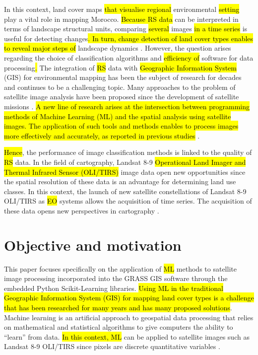 \documentclass[geomatics,article,submit,pdftex,moreauthors]{Definitions/mdpi}
\begin{document}
In this context, land cover maps \hl{that visualise regional} environmental \hl{setting} play a vital role in mapping\hl{ }Morocco. \hl{Because RS data} can be interpreted in terms of landscape structural units, comparing \hl{several }images \hl{in a time series }is useful for detecting changes\hl{. In turn, change detection of land cover types enables to reveal major steps of }landscape dynamics \cite{CAI2023103226,Lemenkova202405,XIONG2022109132}. However, the question arises regarding the choice of classification algorithms and \hl{efficiency of }software for data processing\hl{. }The integration of \hl{RS} data with \hl{Geographic Information System }(GIS) for environmental mapping has been the subject of research for decades and continues to be a challenging topic. Many approaches to the problem of satellite image analysis have been proposed since the development of satellite missions \cite{NOY2023103377,Lemenkova202403,Su02062020,Potter18102014,Lemenkova202402}. \hl{A new line of research  arises at the intersection between programming methods of Machine Learning (ML) and the spatial analysis using satellite images. The application of such tools and methods enables to process images more effectively and accurately, as reported in previous studies} \cite{rs16244812,w17010050,fire8010008}. 

\hl{Hence}, the performance of image classification methods is linked to the quality of \hl{RS} data. In the field of cartography, Landsat 8-9 \hl{Operational Land Imager and Thermal Infrared Sensor (OLI/TIRS)} image data open new opportunities since the spatial resolution of these data is an advantage for determining land use classes. In this context, the launch of new satellite constellations of Landsat 8-9 OLI/TIRS as \hl{EO} systems allows the acquisition of time series. The acquisition of these data opens new perspectives in cartography \cite{Farah05012010,Lemenkova202322,Layati03042022,Layati28082024}.

\section{Objective and motivation}

This paper focuses specifically on the application of \hl{ML} methods to satellite image processing incorporated into the GRASS GIS software through the embedded Python Scikit-Learning libraries. \hl{Using ML in the traditional Geographic Information System (GIS) for mapping land cover types is a challenge that has been researched for many years and has many proposed solutions}. Machine learning is an artificial approach to geospatial data processing that relies on mathematical and statistical algorithms to give computers the ability to “learn” from data. \hl{In this context, ML} can be applied to satellite images such as Landsat 8-9 OLI/TIRS since pixels are discrete quantitative variables \cite{DAPAZGOMES,Lemenkova202026,LAROCHEPINEL2024109163}. 
\end{document}
